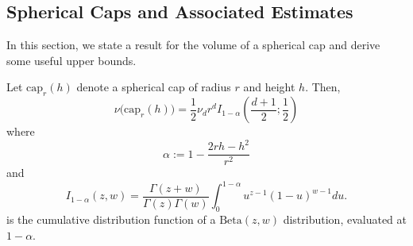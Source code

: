 \documentclass[11pt,twoside]{article}
\newcommand{\1}{\mathbbm{1}}
\begin{document}
\subsection{Spherical Caps and Associated Estimates}
\label{sec:caps}
In this section, we state a result for the volume of a spherical cap and derive some 
useful upper bounds. 
\begin{lemma}
	\label{lem: volume_of_spherical_cap}
	Let $\mathrm{cap}_r(h)$ denote a spherical cap of radius $r$ and height $h$. Then, 
	\begin{equation*}
	\nu\bigl( \mathrm{cap}_r(h)  \bigr) = \frac{1}{2} \nu_d r^d I_{1 - \alpha}\left(\frac{d + 1}{2}; \frac{1}{2}\right)
	\end{equation*}
	where
	\begin{equation*}
	\alpha := 1 - \frac{2 r h - h^2}{r^2}
	\end{equation*}
	and
	\begin{equation*}
	I_{1 - \alpha}(z,w) = \frac{\Gamma(z + w)}{\Gamma(z) \Gamma(w)} \int_{0}^{1 - \alpha} u^{z - 1} (1 - u)^{w - 1} du.
	\end{equation*}
	is the cumulative distribution function of a $\mathrm{Beta}(z,w)$ distribution, evaluated at $1 - \alpha$. 
\end{lemma}
\end{document}
